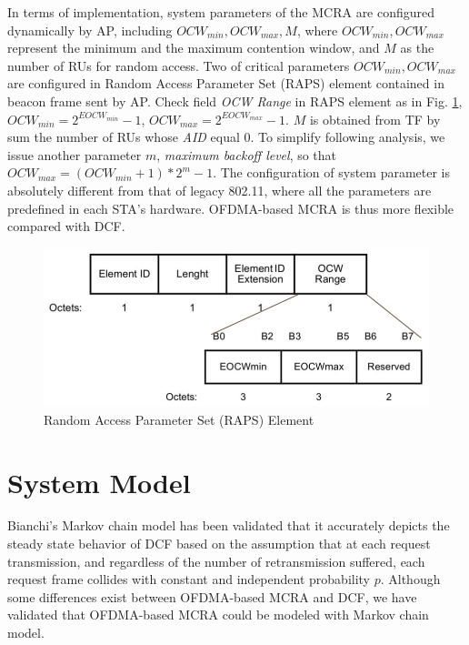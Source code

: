 \documentclass[journal]{IEEEtran}
\begin{document}
In terms of implementation, system parameters of the MCRA are configured dynamically by AP, including $OCW_{min}, OCW_{max}, M$, where $OCW_{min}, OCW_{max}$ represent the minimum and the maximum contention window, and $M$ as the number of RUs for random access. 
Two of critical parameters $OCW_{min}, OCW_{max}$ are configured in Random Access Parameter Set (RAPS) element contained in beacon frame sent by AP.
Check field \textit{OCW Range} in RAPS element as in Fig. \ref{fig_RAPS}, $OCW_{min} = 2^{EOCW_{min}}-1$, $OCW_{max} = 2^{EOCW_{max}}-1$. 
$M$ is obtained from TF by sum the number of RUs whose \textit{AID} equal 0.
To simplify following analysis, we issue another parameter $m$, \textit{maximum backoff level}, so that $OCW_{max} = (OCW_{min}+1)*2^m-1$. 
The configuration of system parameter is absolutely different from that of legacy 802.11, where all the parameters are predefined in each STA's hardware. 
OFDMA-based MCRA is thus more flexible compared with DCF.




\begin{figure}[!h]
\includegraphics[scale=0.3]{./figure/RAPS.png}
\caption{Random Access Parameter Set (RAPS) Element}
\label{fig_RAPS}
\end{figure}



\section{System Model} 		\label{sec_sys_model}
Bianchi's Markov chain model has been validated that it accurately depicts the steady state behavior of DCF based on the assumption that at each request transmission, and regardless of the number of retransmission suffered, each request frame collides with constant and independent probability $p$. 
Although some differences exist between OFDMA-based MCRA and DCF, we have validated that OFDMA-based MCRA could be modeled with Markov chain model.
\end{document}
